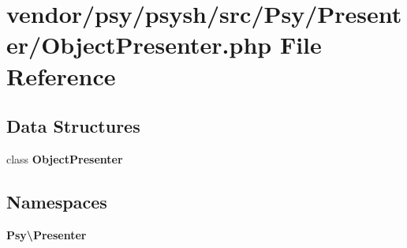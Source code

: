 \section{vendor/psy/psysh/src/\+Psy/\+Presenter/\+Object\+Presenter.php File Reference}
\label{_object_presenter_8php}
\subsection*{Data Structures}
\begin{DoxyCompactItemize}
\item 
class {\bf Object\+Presenter}
\end{DoxyCompactItemize}
\subsection*{Namespaces}
\begin{DoxyCompactItemize}
\item 
 {\bf Psy\textbackslash{}\+Presenter}
\end{DoxyCompactItemize}
